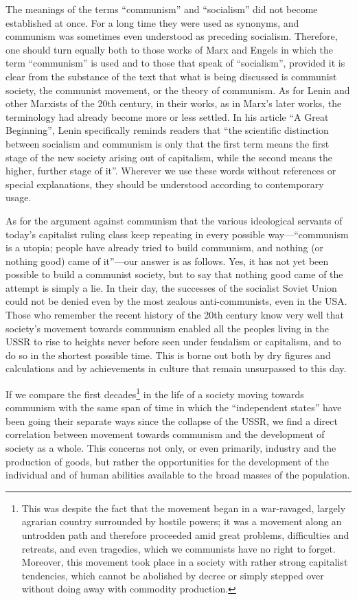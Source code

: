\documentclass[12pt,a4paper,openany]{book}
\begin{document}
The meanings of the terms “communism” and “socialism” did not become established at once. For a long time they were used as synonyms, and communism was sometimes even understood as preceding socialism. Therefore, one should turn equally both to those works of Marx and Engels in which the term “communism” is used and to those that speak of “socialism”, provided it is clear from the substance of the text that what is being discussed is communist society, the communist movement, or the theory of communism. As for Lenin and other Marxists of the 20th century, in their works, as in Marx’s later works, the terminology had already become more or less settled. In his article “A Great Beginning”, Lenin specifically reminds readers that “the scientific distinction between socialism and communism is only that the first term means the first stage of the new society arising out of capitalism, while the second means the higher, further stage of it”. Wherever we use these words without references or special explanations, they should be understood according to contemporary usage.

As for the argument against communism that the various ideological servants of today’s capitalist ruling class keep repeating in every possible way—“communism is a utopia; people have already tried to build communism, and nothing (or nothing good) came of it”—our answer is as follows. Yes, it has not yet been possible to build a communist society, but to say that nothing good came of the attempt is simply a lie. In their day, the successes of the socialist Soviet Union could not be denied even by the most zealous anti-communists, even in the USA. Those who remember the recent history of the 20th century know very well that society’s movement towards communism enabled all the peoples living in the USSR to rise to heights never before seen under feudalism or capitalism, and to do so in the shortest possible time. This is borne out both by dry figures and calculations and by achievements in culture that remain unsurpassed to this day.

If we compare the first decades\footnote{This was despite the fact that the movement began in a war-ravaged, largely agrarian country surrounded by hostile powers; it was a movement along an untrodden path and therefore proceeded amid great problems, difficulties and retreats, and even tragedies, which we communists have no right to forget. Moreover, this movement took place in a society with rather strong capitalist tendencies, which cannot be abolished by decree or simply stepped over without doing away with commodity production.} in the life of a society moving towards communism with the same span of time in which the “independent states” have been going their separate ways since the collapse of the USSR, we find a direct correlation between movement towards communism and the development of society as a whole. This concerns not only, or even primarily, industry and the production of goods, but rather the opportunities for the development of the individual and of human abilities available to the broad masses of the population.
\end{document}
